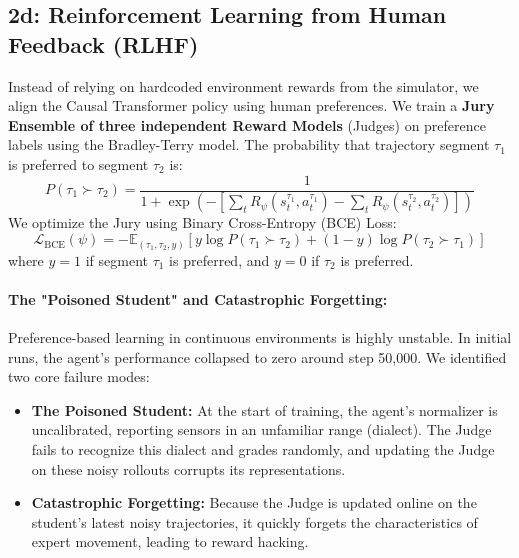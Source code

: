 \documentclass[11pt,a4paper]{article}
\begin{document}
\FloatBarrier
\subsection{2d: Reinforcement Learning from Human Feedback (RLHF)}
Instead of relying on hardcoded environment rewards from the simulator, we align the Causal Transformer policy using human preferences. We train a \textbf{Jury Ensemble of three independent Reward Models} (Judges) on preference labels using the Bradley-Terry model. The probability that trajectory segment $\tau_1$ is preferred to segment $\tau_2$ is:
\begin{equation}
P(\tau_1 \succ \tau_2) = \frac{1}{1 + \exp\left( - \left[ \sum_{t} R_\psi(s_t^{\tau_1}, a_t^{\tau_1}) - \sum_{t} R_\psi(s_t^{\tau_2}, a_t^{\tau_2}) \right] \right)}
\end{equation}
We optimize the Jury using Binary Cross-Entropy (BCE) Loss:
\begin{equation}
\mathcal{L}_{\text{BCE}}(\psi) = - \mathbb{E}_{(\tau_1, \tau_2, y)} \left[ y \log P(\tau_1 \succ \tau_2) + (1-y) \log P(\tau_2 \succ \tau_1) \right]
\end{equation}
where $y=1$ if segment $\tau_1$ is preferred, and $y=0$ if $\tau_2$ is preferred.

\paragraph{The "Poisoned Student" and Catastrophic Forgetting:}
Preference-based learning in continuous environments is highly unstable. In initial runs, the agent's performance collapsed to zero around step 50,000. We identified two core failure modes:
\begin{itemize}
    \item \textbf{The Poisoned Student:} At the start of training, the agent's normalizer is uncalibrated, reporting sensors in an unfamiliar range (dialect). The Judge fails to recognize this dialect and grades randomly, and updating the Judge on these noisy rollouts corrupts its representations.
    \item \textbf{Catastrophic Forgetting:} Because the Judge is updated online on the student's latest noisy trajectories, it quickly forgets the characteristics of expert movement, leading to reward hacking.
\end{itemize}
\end{document}
